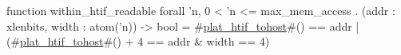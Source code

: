 function within_htif_readable forall 'n, 0 < 'n <= max_mem_access . (addr : xlenbits, width : atom('n)) -> bool =
    #\hyperref[sailRISCVzplatzyhtifzytohost]{plat\_htif\_tohost}#() == addr | (#\hyperref[sailRISCVzplatzyhtifzytohost]{plat\_htif\_tohost}#() + 4 == addr & width == 4)
